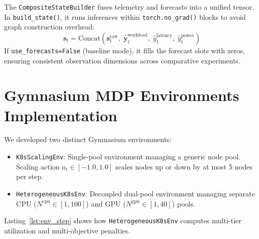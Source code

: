 \documentclass[12pt]{report}
\begin{document}
The \texttt{CompositeStateBuilder} fuses telemetry and forecasts into a unified tensor. In \texttt{build\_state()}, it runs inferences within \texttt{torch.\allowbreak no\_grad()} blocks to avoid graph construction overhead:
\begin{equation}
\mathbf{s}_t = \text{Concat}\left( \mathbf{s}_t^{\text{raw}}, \; \hat{\mathbf{y}}_t^{\text{workload}}, \; \hat{y}_t^{\text{latency}}, \; \hat{y}_t^{\text{power}} \right)
\end{equation}
If \texttt{use\_forecasts=False} (baseline mode), it fills the forecast slots with zeros, ensuring consistent observation dimensions across comparative experiments.

\section{Gymnasium MDP Environments Implementation}

We developed two distinct Gymnasium environments:
\begin{itemize}
\item \texttt{K8sScalingEnv}: Single-pool environment managing a generic node pool. Scaling action $a_t \in [-1.0, 1.0]$ scales nodes up or down by at most 5 nodes per step.
\item \texttt{HeterogeneousK8sEnv}: Decoupled dual-pool environment managing separate CPU ($N^{\text{cpu}} \in [1, 100]$) and GPU ($N^{\text{gpu}} \in [1, 40]$) pools.
\end{itemize}

Listing~\ref{lst:env_step} shows how \texttt{HeterogeneousK8sEnv} computes multi-tier utilization and multi-objective penalties.
\end{document}
